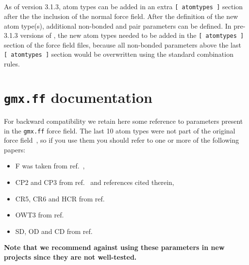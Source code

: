 \subsection{}
As of {\gromacs} version 3.1.3, atom types can be added in an extra
{\tt [~atomtypes~]} section after the the inclusion of the normal
force field. After the definition of the new atom type(s), additional
non-bonded and pair parameters can be defined.
In pre-3.1.3 versions of {\gromacs}, the new atom types needed to be
added in the {\tt [~atomtypes~]} section of the force field files,
because all non-bonded parameters above the last {\tt [~atomtypes~]}
section would be overwritten using the standard combination rules.

\section{{\tt gmx.ff} documentation}
For backward compatibility we retain here some reference to parameters
present in the {\tt gmx.ff} force field. The last 10 atom types were
not part of the original  force field~\cite{biomos}, so
if you use them you should refer to one or more of the following
papers:
\begin{itemize}
\item F was taken from ref.~\cite{Buuren93a}, 
\item CP2 and CP3 from ref.~\cite{Buuren93b} and references cited therein, 
\item CR5, CR6 and HCR from ref.~\cite{Spoel96c}
\item OWT3 from ref.~\cite{Jorgensen83}
\item SD, OD and CD from ref.~\cite{Liu95}
\end{itemize}
{\bf Note that we recommend against using these parameters in new projects
since they are not well-tested.}

